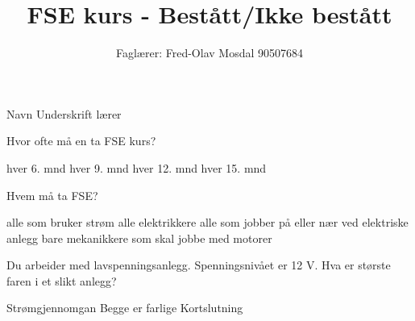 \documentclass{exam}
\begin{document}
\title{FSE kurs -  Bestått/Ikke bestått}
\author{Faglærer: Fred-Olav Mosdal 90507684\\}
\maketitle

\vskip 5cm 
\Huge
Navn \uline{\hfill}
\vskip 2cm 
Underskrift lærer \uline{\hfill}
\normalsize
\newpage
\begin{questions}
        
	\question Hvor ofte må  en ta FSE kurs? 
		\begin{oneparcheckboxes}
			\choice hver 6. mnd
			\choice hver 9. mnd
			\choice hver 12. mnd
			\choice hver 15. mnd
		\end{oneparcheckboxes}




	\question Hvem må ta FSE?
		\begin{oneparcheckboxes}
			\choice alle som bruker strøm
			\choice alle elektrikkere
			\choice alle som jobber på eller nær ved elektriske anlegg
			\choice bare mekanikkere som skal jobbe med motorer
		\end{oneparcheckboxes}



	\question Du arbeider med lavspenningsanlegg. Spenningsnivået er 12 V. Hva er største faren i et slikt anlegg?
	\begin{oneparcheckboxes}
		\choice Strømgjennomgan
		\choice Begge er farlige
		\choice Kortslutning
	\end{oneparcheckboxes}


\end{questions}
\end{document}
